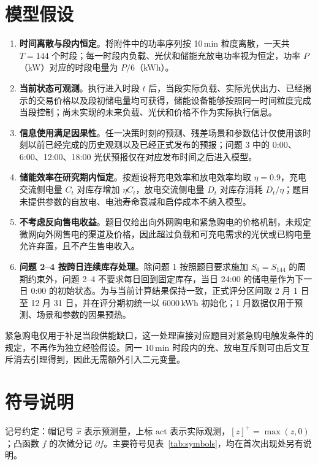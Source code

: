 \section{模型假设}
\begin{enumerate}
\item \textbf{时间离散与段内恒定}。将附件中的功率序列按 10\,min 粒度离散，一天共 $T=144$ 个时段；每一时段内负载、光伏和储能充放电功率视为恒定，功率 $P$（kW）对应的时段电量为 $P/6$（kWh）。
\item \textbf{当前状态可观测}。执行进入时段 $t$ 后，当段实际负载、实际光伏出力、已经揭示的交易价格以及段初储电量均可获得，储能设备能够按照同一时间粒度完成当段控制；尚未实现的未来负载、光伏和价格不作为实际执行信息。
\item \textbf{信息使用满足因果性}。任一决策时刻的预测、残差场景和参数估计仅使用该时刻以前已经完成的历史观测以及已经正式发布的预报；问题 3 中的 0:00、6:00、12:00、18:00 光伏预报仅在对应发布时间之后进入模型。
\item \textbf{储能效率在研究期内恒定}。按题设将充电效率和放电效率均取 $\eta=0.9$，充电交流侧电量 $C_t$ 对库存增加 $\eta C_t$，放电交流侧电量 $D_t$ 对库存消耗 $D_t/\eta$；题目未提供参数的自放电、电池寿命衰减和启停成本不纳入模型。
\item \textbf{不考虑反向售电收益}。题目仅给出向外网购电和紧急购电的价格机制，未规定微网向外网售电的渠道及价格，因此超过负载和可充电需求的光伏或已购电量允许弃置，且不产生售电收入。
\item \textbf{问题 2--4 按跨日连续库存处理}。除问题 1 按照题目要求施加 $S_0=S_{144}$ 的周期约束外，问题 2--4 不要求每日回到固定库存，当日 24:00 的储电量作为下一日 0:00 的初始状态。为与当前计算结果保持一致，正式评分区间取 2 月 1 日至 12 月 31 日，并在评分期初统一以 6000\,kWh 初始化；1 月数据仅用于预测、场景和参数的因果预热。
\end{enumerate}

紧急购电仅用于补足当段供能缺口，这一处理直接对应题目对紧急购电触发条件的规定，不再作为独立经验假设。同一 10\,min 时段内的充、放电互斥则可由后文互斥消去引理得到，因此无需额外引入二元变量。

\section{符号说明}
记号约定：帽记号 $\hat x$ 表示预测量，上标 $\mathrm{act}$ 表示实际观测，$[z]^+=\max(z,0)$；凸函数 $f$ 的次微分记 $\partial f$。主要符号见表~\ref{tab:symbols}，均在首次出现处另有说明。

